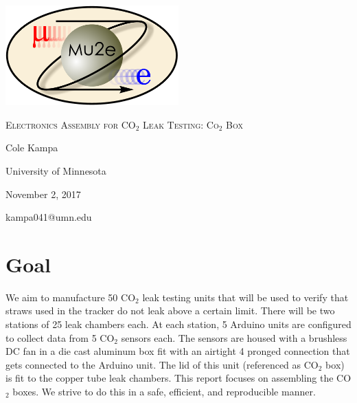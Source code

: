 \documentclass[letterpaper,12pt]{article}
\begin{document}
\begin{titlepage}
	\centering
	\includegraphics[width=0.5\textwidth]{mu2e_logo_oval.png}\par\vspace{2cm}
	{\scshape\LARGE Electronics Assembly for CO$_2$ Leak Testing: Co$_2$ Box\par}
	\vspace{3cm}
	{\Large Cole Kampa\par}
	\vspace{3cm}
	{\large University of Minnesota\par}
 	\vspace{.5cm}
	{\large November 2, 2017\par}
	\vfill
	{kampa041@umn.edu\par}
\end{titlepage}

\clearpage
\setcounter{page}{2}


\section{Goal}
We aim to manufacture 50 CO$_2$ leak testing units that will be used to verify that straws used in the tracker do not leak above a certain limit. There will be two stations of 25 leak chambers each. At each station, 5 Arduino units are configured to collect data from 5 CO$_2$ sensors each. The sensors are housed with a brushless DC fan in a die cast aluminum box fit with an airtight 4 pronged connection that gets connected to the Arduino unit. The lid of this unit (referenced as CO$_2$ box) is fit to the copper tube leak chambers. This report focuses on assembling the CO$_2$ boxes. We strive to do this in a safe, efficient, and reproducible manner.
\end{document}
